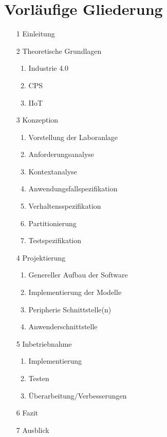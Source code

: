 \documentclass[12pt, a4paper, twoside]{article} %
\begin{document}
\section{Vorläufige Gliederung}
\begin{itemize}
	\item[1] Einleitung
	\item[2] Theoretische Grundlagen
	\begin{enumerate}[label*=\arabic*.]
		\item Industrie 4.0
		\item CPS
		\item IIoT
	\end{enumerate}
	\item[3] Konzeption
	\begin{enumerate}[label*=\arabic*.]
		\item Vorstellung der Laboranlage
		\item Anforderungsanalyse
		\item Kontextanalyse
		\item Anwendungsfallspezifikation
		\item Verhaltensspezifikation
		\item Partitionierung
		\item Testspezifikation
	\end{enumerate}
	\item[4] Projektierung
	\begin{enumerate}[label*=\arabic*.]
		\item Genereller Aufbau der Software
		\item Implementierung der Modelle
		\item Peripherie Schnittstelle(n)
		\item Anwenderschnittstelle
	\end{enumerate}
	\item[5] Inbetriebnahme
	\begin{enumerate}[label*=\arabic*.]
		\item Implementierung
		\item Testen
		\item Überarbeitung/Verbesserungen
	\end{enumerate} 
	\item[6] Fazit
	\item[7] Ausblick
\end{itemize}
\end{document}
